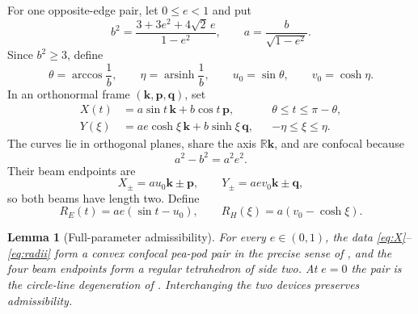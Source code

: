 \documentclass[11pt]{article}
\numberwithin{equation}{section}
\newtheorem{lemma}[theorem]{Lemma}
\theoremstyle{remark}
\newcommand{\R}{\mathbb{R}}
\newcommand{\arsinh}{\operatorname{arsinh}}
\begin{document}
For one opposite-edge pair, let \(0\le e<1\) and put
\begin{equation}
  b^2=\frac{3+3e^2+4\sqrt2\,e}{1-e^2},
  \qquad
  a=\frac b{\sqrt{1-e^2}}.
  \label{eq:ab}
\end{equation}
Since \(b^2\ge3\), define
\[
  \theta=\arccos\frac1b,
  \qquad
  \eta=\arsinh\frac1b,
  \qquad
  u_0=\sin\theta,
  \qquad
  v_0=\cosh\eta.
\]
In an orthonormal frame \((\mathbf k,\mathbf p,\mathbf q)\), set
\begin{align}
  X(t)&=a\sin t\,\mathbf k+b\cos t\,\mathbf p,
  &&\theta\le t\le\pi-\theta,\label{eq:X}\\
  Y(\xi)&=ae\cosh\xi\,\mathbf k+b\sinh\xi\,\mathbf q,
  &&-\eta\le\xi\le\eta.\label{eq:Y}
\end{align}
The curves lie in orthogonal planes, share the axis \(\R\mathbf k\), and are confocal because
\[
  a^2-b^2=a^2e^2.
\]
Their beam endpoints are
\[
  X_\pm=a u_0\mathbf k\pm\mathbf p,
  \qquad
  Y_\pm=ae v_0\mathbf k\pm\mathbf q,
\]
so both beams have length two.  Define
\begin{equation}
  R_E(t)=ae(\sin t-u_0),
  \qquad
  R_H(\xi)=a(v_0-\cosh\xi).
  \label{eq:radii}
\end{equation}

\begin{lemma}[Full-parameter admissibility]
\label{lem:admissible}
For every \(e\in(0,1)\), the data \eqref{eq:X}--\eqref{eq:radii} form a convex confocal pea-pod pair in the precise sense of \cite[Definition~3.5]{ArelioMontejanoOliveros2023}, and the four beam endpoints form a regular tetrahedron of side two.  At \(e=0\) the pair is the circle-line degeneration of \cite[Section~5.3]{ArelioMontejanoOliveros2023}.  Interchanging the two devices preserves admissibility.
\end{lemma}
\end{document}
